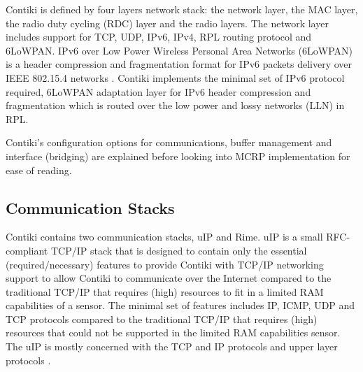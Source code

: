 Contiki is defined by four layers network stack: the network layer, the MAC layer, the radio duty cycling (RDC) layer and the radio layers. The network layer includes support for TCP, UDP, IPv6, IPv4, RPL routing protocol and 6LoWPAN. IPv6 over Low Power Wireless Personal Area Networks (6LoWPAN) is a header compression and fragmentation format for IPv6 packets delivery over IEEE 802.15.4 networks \cite{6lowpan}. Contiki implements the minimal set of IPv6 protocol required, 6LoWPAN adaptation layer for IPv6 header compression and fragmentation which is routed over the low power and lossy networks (LLN) in RPL.

Contiki's configuration options for communications, buffer management and interface (bridging) are explained before looking into MCRP implementation for ease of reading.



\subsection{Communication Stacks}
\label{commstack}
Contiki contains two communication stacks, uIP and Rime.
uIP \cite{uip} is a small RFC-compliant TCP/IP stack that is designed to contain only the essential (required/necessary) features to provide Contiki with TCP/IP networking support to allow Contiki to communicate over the Internet compared to the traditional TCP/IP that requires (high) resources to fit in a limited RAM capabilities of a sensor. The minimal set of features includes IP, ICMP, UDP and TCP protocols compared to the traditional TCP/IP that requires (high) resources that could not be supported in the limited RAM capabilities sensor. The uIP is mostly concerned with the TCP and IP protocols and upper layer protocols \cite{contikiDoc, contikiUIP}. 

